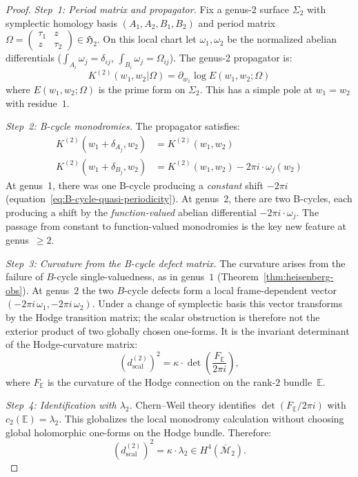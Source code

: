 \begin{proof}
\emph{Step~1: Period matrix and propagator.}
Fix a genus-2 surface $\Sigma_2$ with symplectic homology basis
$(A_1, A_2, B_1, B_2)$ and period matrix
$\Omega = \begin{pmatrix} \tau_1 & z \\ z & \tau_2 \end{pmatrix}
\in \mathfrak{H}_2$. On this local chart let
$\omega_1,\omega_2$ be the normalized abelian differentials
($\int_{A_i}\omega_j=\delta_{ij}$,
$\int_{B_i}\omega_j=\Omega_{ij}$). The genus-2 propagator is:
\begin{equation}\label{eq:genus2-propagator}
K^{(2)}(w_1, w_2 | \Omega) = \partial_{w_1} \log E(w_1, w_2; \Omega)
\end{equation}
where $E(w_1, w_2; \Omega)$ is the prime form on $\Sigma_2$. This has a simple pole at $w_1 = w_2$ with residue~$1$.

\emph{Step~2: B-cycle monodromies.}
The propagator satisfies:
\begin{align}
K^{(2)}(w_1 + \delta_{A_j}, w_2) &= K^{(2)}(w_1, w_2) \label{eq:genus2-A-periodicity} \\
K^{(2)}(w_1 + \delta_{B_j}, w_2) &= K^{(2)}(w_1, w_2) - 2\pi i \cdot \omega_j(w_2) \label{eq:genus2-B-quasi}
\end{align}
At genus~1, there was one B-cycle producing a \emph{constant} shift $-2\pi i$ (equation~\eqref{eq:B-cycle-quasi-periodicity}). At genus~2, there are two B-cycles, each producing a shift by the \emph{function-valued} abelian differential $-2\pi i \cdot \omega_j$. The passage from constant to function-valued monodromies is the key new feature at genus~$\geq 2$.

\emph{Step~3: Curvature from the B-cycle defect matrix.}
The curvature arises from the failure of $B$-cycle single-valuedness,
as in genus~$1$ (Theorem~\ref{thm:heisenberg-obs}). At genus~$2$ the
two $B$-cycle defects form a local frame-dependent vector
$(-2\pi i\,\omega_1,-2\pi i\,\omega_2)$. Under a change of symplectic
basis this vector transforms by the Hodge transition matrix; the
scalar obstruction is therefore not the exterior product of two
globally chosen one-forms. It is the invariant determinant of the
Hodge-curvature matrix:
\begin{equation}\label{eq:genus2-curvature-product}
(d^{(2)}_{\mathrm{scal}})^2
= \kappa \cdot
\det\!\left(\frac{F_{\mathbb E}}{2\pi i}\right),
\end{equation}
where $F_{\mathbb E}$ is the curvature of the Hodge connection on the
rank-$2$ bundle~$\mathbb E$.

\emph{Step~4: Identification with $\lambda_2$.}
Chern--Weil theory identifies
$\det(F_{\mathbb E}/2\pi i)$ with
$c_2(\mathbb E)=\lambda_2$. This globalizes the local monodromy
calculation without choosing global holomorphic one-forms on the
Hodge bundle. Therefore:
\begin{equation}
(d^{(2)}_{\mathrm{scal}})^2
= \kappa \cdot \lambda_2 \in H^4(\overline{\mathcal{M}}_2).
\end{equation}
\end{proof}

